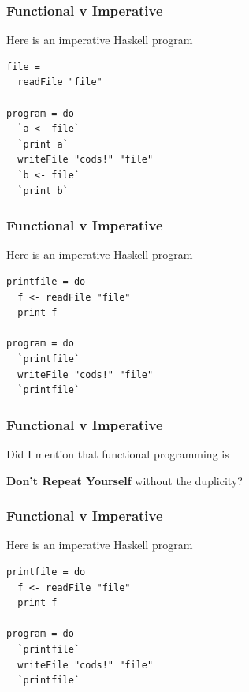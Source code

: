 \begin{frame}[fragile]
\frametitle{Functional v Imperative}
\begin{block}{Here is an imperative Haskell program}
\begin{lstlisting}[style=haskell,mathescape]
file =
  readFile "file"

program = do
  `a <- file`
  `print a`
  writeFile "cods!" "file"
  `b <- file`
  `print b`
\end{lstlisting}
\end{block}
\end{frame}


\begin{frame}[fragile]
\frametitle{Functional v Imperative}
\begin{block}{Here is an imperative Haskell program}
\begin{lstlisting}[style=haskell,mathescape]
printfile = do
  f <- readFile "file"
  print f

program = do
  `printfile`
  writeFile "cods!" "file"
  `printfile`
\end{lstlisting}
\end{block}
\end{frame}


\begin{frame}[fragile]
\frametitle{Functional v Imperative}
\begin{block}{Did I mention that functional programming is}
\begin{center}
\textbf{Don't Repeat Yourself} without the duplicity?
\end{center}
\end{block}
\end{frame}


\begin{frame}[fragile]
\frametitle{Functional v Imperative}
\begin{block}{Here is an imperative Haskell program}
\begin{lstlisting}[style=haskell,mathescape]
printfile = do
  f <- readFile "file"
  print f

program = do
  `printfile`
  writeFile "cods!" "file"
  `printfile`
\end{lstlisting}
\end{block}
\end{frame}


